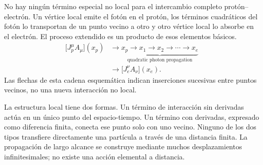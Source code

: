 No hay ningún término especial no local para el intercambio completo protón--electrón. Un vértice local emite el fotón en el protón, los términos cuadráticos del fotón lo transportan de un punto vecino a otro y otro vértice local lo absorbe en el electrón. El proceso extendido es un producto de esos elementos básicos.
\begin{equation}
\begin{aligned}
\bigl[J_p^\mu A_\mu\bigr](x_p)
&\longrightarrow
\underbrace{x_p\to x_1\to x_2\to\cdots\to x_e}_{\text{quadratic photon propagation}}
\\
&\longrightarrow
\bigl[J_e^\nu A_\nu\bigr](x_e).
\end{aligned}
\end{equation}
Las flechas de esta cadena esquemática indican inserciones sucesivas entre puntos vecinos, no una nueva interacción no local.

\begin{classroomqa}
\end{classroomqa}

La estructura local tiene dos formas. Un término de interacción sin derivadas actúa en un único punto del espacio-tiempo. Un término con derivadas, expresado como diferencia finita, conecta ese punto solo con uno vecino. Ninguno de los dos tipos transfiere directamente una partícula a través de una distancia finita. La propagación de largo alcance se construye mediante muchos desplazamientos infinitesimales; no existe una acción elemental a distancia.

\begin{classroomqa}
\end{classroomqa}

\begin{classroomqa}
\end{classroomqa}

